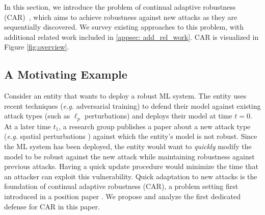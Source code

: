 In this section, we introduce the problem of continual adaptive robustness (CAR)~\cite{dai2024position}, which aims to achieve robustness against new attacks as they are sequentially discovered. We survey existing approaches to this problem, with additional related work included in \cref{appsec: add_rel_work}.  CAR is visualized in Figure \ref{fig:overview}.

\subsection{A Motivating Example}
Consider an entity that wants to deploy a robust ML system. The entity uses recent techniques (\emph{e.g.} adversarial training) to defend their model  against existing attack types (such as $\ell_p$ perturbations) and deploys their model at time $t=0$. At a later time $t_1$, a research group publishes a paper about a new attack type (\emph{e.g.} spatial perturbations \citep{XiaoZ0HLS18}) against which the entity's model is not robust.  Since the ML system has been deployed, the entity would want to \textit{quickly} modify the model to be robust against the new attack while maintaining robustness against previous attacks.  Having a quick update procedure would minimize the time that an attacker can exploit this vulnerability.  Quick adaptation to new attacks is the foundation of continual adaptive robustness (CAR), a problem setting first introduced in a position paper \citep{dai2024position}.  We propose and analyze the first dedicated defense for CAR in this paper.%


